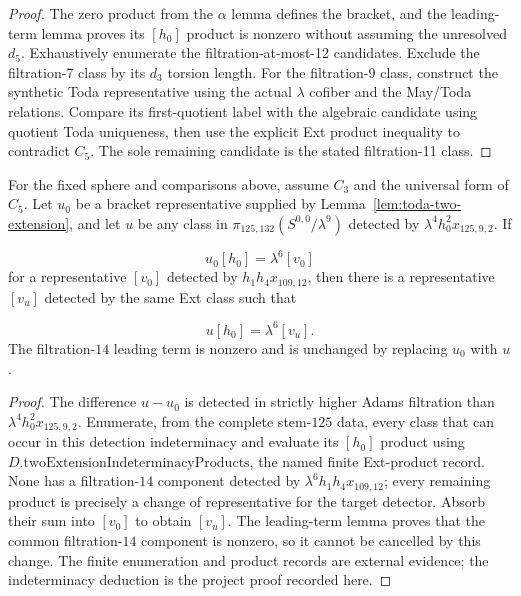 \begin{proof}
  The zero product from the $\alpha$ lemma defines the bracket, and the
  leading-term lemma proves its $[h_0]$ product is nonzero without assuming the
  unresolved $d_5$.  Exhaustively enumerate the filtration-at-most-12
  candidates.  Exclude the filtration-7 class by its $d_3$ torsion length.
  For the filtration-9 class, construct the synthetic Toda representative
  using the actual $\lambda$ cofiber and the May/Toda relations. Compare its
  first-quotient label with the algebraic candidate using quotient Toda
  uniqueness, then use the explicit Ext product inequality to contradict
  $C_5$. The sole remaining candidate is the stated filtration-11 class.
\end{proof}

\begin{lemma}
  \label{lem:near126-two-extension-indeterminacy}
  \notready
  For the fixed sphere and comparisons above, assume $C_3$ and the universal form
  of $C_5$.  Let $u_0$ be a bracket
  representative supplied by Lemma~\ref{lem:toda-two-extension}, and let $u$
  be any class in $\pi_{125,132}(S^{0,0}/\lambda^9)$ detected by
  $\lambda^4h_0^2x_{125,9,2}$.  If

  \[
    u_0[h_0]=\lambda^6[v_0]
  \]
  for a representative $[v_0]$ detected by $h_1h_4x_{109,12}$, then there is
  a representative $[v_u]$ detected by the same Ext class such that

  \[
    u[h_0]=\lambda^6[v_u].
  \]
  The filtration-$14$ leading term is nonzero and is unchanged by replacing
  $u_0$ with $u$.
\end{lemma}

\begin{proof}
  The difference $u-u_0$ is detected in strictly higher Adams filtration than
  $\lambda^4h_0^2x_{125,9,2}$.  Enumerate, from the complete stem-$125$ data,
  every class that can occur in this detection indeterminacy and evaluate its
  $[h_0]$ product using $D.\mathrm{twoExtensionIndeterminacyProducts}$, the
  named finite Ext-product record.  None has a
  filtration-$14$ component detected by
  $\lambda^6h_1h_4x_{109,12}$; every remaining product is precisely a change
  of representative for the target detector.  Absorb their sum into $[v_0]$
  to obtain $[v_u]$.  The leading-term lemma proves that the common
  filtration-$14$ component is nonzero, so it cannot be cancelled by this
  change.  The finite enumeration and product records are external evidence;
  the indeterminacy deduction is the project proof recorded here.
\end{proof}

